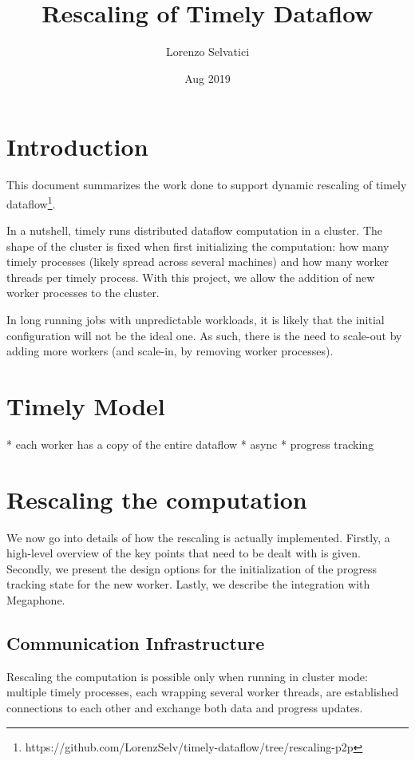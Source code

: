 \documentclass[12pt]{extarticle}
\title{Rescaling of Timely Dataflow}
\author{Lorenzo Selvatici}
\date{Aug 2019}
\begin{document}
\maketitle

\section{Introduction}

This document summarizes the work done to support dynamic rescaling of timely dataflow\footnote{https://github.com/LorenzSelv/timely-dataflow/tree/rescaling-p2p}.

In a nutshell, timely runs distributed dataflow computation in a cluster. The shape of the cluster is fixed
when first initializing the computation: how many timely processes (likely spread across several machines) and how many worker threads per timely process.
With this project, we allow the addition of new worker processes to the cluster.

In long running jobs with unpredictable workloads, it is likely that the initial configuration will not be the ideal one.
As such, there is the need to scale-out by adding more workers (and scale-in, by removing worker processes).

\section{Timely Model}

* each worker has a copy of the entire dataflow
* async
* progress tracking

\section{Rescaling the computation}

We now go into details of how the rescaling is actually implemented.
Firstly, a high-level overview of the key points that need to be dealt with is given.
Secondly, we present the design options for the initialization of the progress tracking state for the new worker.
Lastly, we describe the integration with Megaphone.

\subsection{Communication Infrastructure}

Rescaling the computation is possible only when running in cluster mode: multiple timely processes, each wrapping several worker
threads, are established connections to each other and exchange both data and progress updates.
\end{document}
